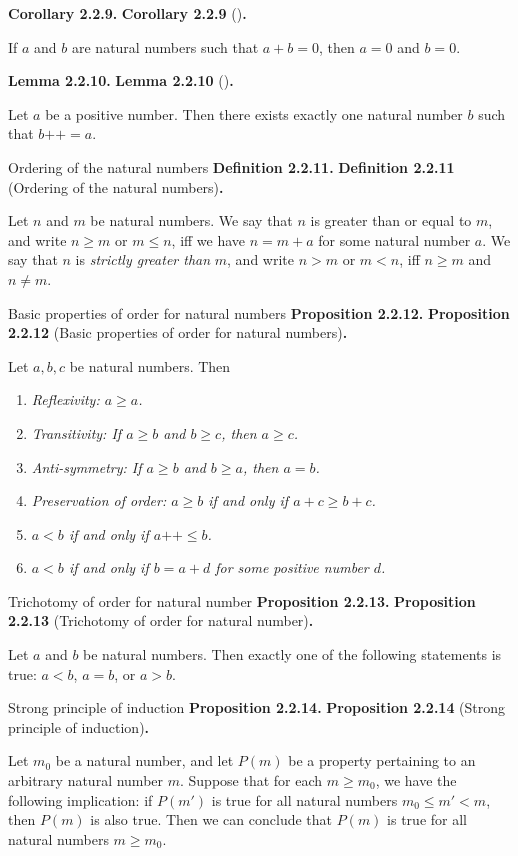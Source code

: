 \documentclass[12pt]{article}
\newcommand{\succr}[1]{#1 \textrm{++}}
\newenvironment{df}[2][\relax]{
\vspace{4mm}
    \noindent\setlength{\parskip}{1em}%
    \ifx#1\relax%
        \textbf{#2. }%
    \else%
        \textbf{#2} (#1)\textbf{. }%
    \fi%
    \ignorespaces%
}{}
\theoremstyle{remark}
\begin{document}
\begin{df}{Corollary 2.2.9}
    If $a$ and $b$ are natural numbers such that $a + b = 0$, then $a = 0$ and $b = 0$.
\end{df}


\begin{df}{Lemma 2.2.10}
    Let $a$ be a positive number.
    Then there exists exactly one natural number $b$ such that $\succr{b} = a$.
\end{df}


\begin{df}[Ordering of the natural numbers]{Definition 2.2.11}
    Let $n$ and $m$ be natural numbers.
    We say that $n$ is greater than or equal to $m$, and write $n \ge m$ or $m \le n$, iff we have $n = m + a$ for some natural number $a$.
    We say that $n$ is \emph{strictly greater than} $m$, and write $n > m$ or $m < n$, iff $n \ge m$ and $n \ne m$.
\end{df}


\begin{df}[Basic properties of order for natural numbers]{Proposition 2.2.12}
    Let $a, b, c$ be natural numbers. Then
    \begin{enumerate}[topsep=0mm,parsep=0mm,label=(\alph*)]
        \item \textit{Reflexivity: $a \ge a$.}
        \item \textit{Transitivity: If  $a \ge b$ and $b \ge c$, then $a \ge c$.}
        \item \textit{Anti-symmetry: If $a \ge b$ and $b \ge a$, then $a = b$.}
        \item \textit{Preservation of order: $a \ge b$ if and only if $a + c \ge b + c$.}
        \item \textit{$a < b$ if and only if $\succr{a} \le b$.}
        \item \textit{$a < b$ if and only if $b = a + d$ for some positive number $d$.}
    \end{enumerate}    
\end{df}


\begin{df}[Trichotomy of order for natural number]{Proposition 2.2.13}
    Let $a$ and $b$ be natural numbers.
    Then exactly one of the following statements is true: $a < b$, $a = b$, or $a > b$.
\end{df}


\begin{df}[Strong principle of induction]{Proposition 2.2.14}
    Let $m_0$ be a natural number, and let $P(m)$ be a property pertaining to an arbitrary natural number $m$.
    Suppose that for each $m \ge m_0$, we have the following implication: if $P(m')$ is true for all natural numbers $m_0 \le m' < m$, then $P(m)$ is also true.
    Then we can conclude that $P(m)$ is true for all natural numbers $m \ge m_0$.
\end{df}
\end{document}
